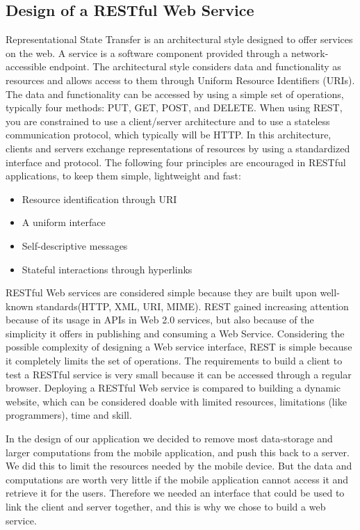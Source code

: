 \subsection{Design of a RESTful Web Service}
\label{subsec:restDes}

Representational State Transfer is an architectural style designed to offer services on the web. A service is a software component provided through a network-accessible endpoint. The architectural style considers data and functionality as resources and allows access to them through Uniform Resource Identifiers (URIs). The data and functionality can be accessed by using a simple set of operations, typically four methods: PUT, GET, POST, and DELETE. When using REST, you are constrained to use a client/server architecture and to use a stateless communication protocol, which typically will be HTTP. In this architecture, clients and servers exchange representations of resources by using a standardized interface and protocol. The following four principles are encouraged in RESTful applications, to keep them simple, lightweight and fast\cite{WhatIsRESTful}\cite{DecidingOnRESTful}:

\begin{itemize}
\item Resource identification through URI
\item A uniform interface
\item Self-descriptive messages
\item Stateful interactions through hyperlinks
\end{itemize}

RESTful Web services are considered simple because they are built upon well-known standards(HTTP, XML, URI, MIME). REST gained increasing attention because of its usage in APIs in Web 2.0 services, but also because of the simplicity it offers in publishing and consuming a Web Service. Considering the possible complexity of designing a Web service interface, REST is simple because it completely limits the set of operations. The requirements to build a client to test a RESTful service is very small because it can be accessed through a regular browser. Deploying a RESTful Web service is compared to building a dynamic website, which can be considered doable with limited resources, limitations (like programmers), time and skill. \cite{DecidingOnRESTful}

In the design of our application we decided to remove most data-storage and larger computations from the mobile application, and push this back to a server. We did this to limit the resources needed by the mobile device. But the data and computations are worth very little if the mobile application cannot access it and retrieve it for the users. Therefore we needed an interface that could be used to link the client and server together, and this is why we chose to build a web service.

